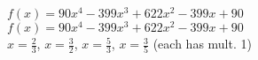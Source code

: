{$f(x) = 90x^{4} - 399x^{3} + 622x^{2} - 399x + 90$}
{$f(x) = 90x^{4} - 399x^{3} + 622x^{2} - 399x + 90$ \\ $x = \frac{2}{3}$, $x = \frac{3}{2}$, $x = \frac{5}{3}$, $x = \frac{3}{5}$ (each has mult. 1)}